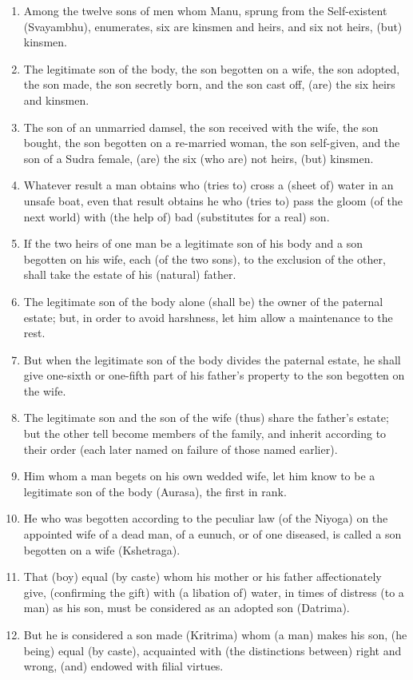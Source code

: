 \begin{enumerate}
\item Among the twelve sons of men whom Manu, sprung from the Self-existent (Svayambhu), enumerates, six are kinsmen and heirs, and six not heirs, (but) kinsmen.
\item The legitimate son of the body, the son begotten on a wife, the son adopted, the son made, the son secretly born, and the son cast off, (are) the six heirs and kinsmen.
\item The son of an unmarried damsel, the son received with the wife, the son bought, the son begotten on a re-married woman, the son self-given, and the son of a Sudra female, (are) the six (who are) not heirs, (but) kinsmen.
\item Whatever result a man obtains who (tries to) cross a (sheet of) water in an unsafe boat, even that result obtains he who (tries to) pass the gloom (of the next world) with (the help of) bad (substitutes for a real) son.
\item If the two heirs of one man be a legitimate son of his body and a son begotten on his wife, each (of the two sons), to the exclusion of the other, shall take the estate of his (natural) father.
\item The legitimate son of the body alone (shall be) the owner of the paternal estate; but, in order to avoid harshness, let him allow a maintenance to the rest.
\item But when the legitimate son of the body divides the paternal estate, he shall give one-sixth or one-fifth part of his father's property to the son begotten on the wife.
\item The legitimate son and the son of the wife (thus) share the father's estate; but the other tell become members of the family, and inherit according to their order (each later named on failure of those named earlier).
\item Him whom a man begets on his own wedded wife, let him know to be a legitimate son of the body (Aurasa), the first in rank.
\item He who was begotten according to the peculiar law (of the Niyoga) on the appointed wife of a dead man, of a eunuch, or of one diseased, is called a son begotten on a wife (Kshetraga).
\item That (boy) equal (by caste) whom his mother or his father affectionately give, (confirming the gift) with (a libation of) water, in times of distress (to a man) as his son, must be considered as an adopted son (Datrima).
\item But he is considered a son made (Kritrima) whom (a man) makes his son, (he being) equal (by caste), acquainted with (the distinctions between) right and wrong, (and) endowed with filial virtues.

\end{enumerate}
